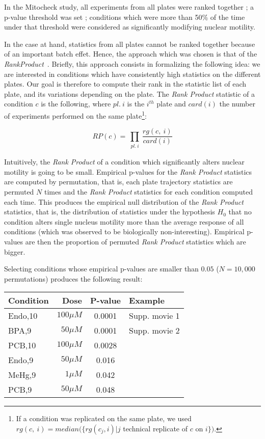 In the Mitocheck study, all experiments from all plates were ranked together ; a p-value threshold was set ; conditions which were more than 50\% of the time under that threshold were considered as significantly modifying nuclear motility. 

In the case at hand, statistics from all plates cannot be ranked together because of an important batch effet. Hence, the approach which was chosen is that of the \textit{RankProduct}~\cite{pmid15327980}. Briefly, this approach consists in formalizing the following idea: we are interested in conditions which have consistently high statistics on the different plates. Our goal is therefore to compute their rank in the statistic list of each plate, and its variations depending on the plate. The \textit{Rank Product} statistic of a condition $c$ is the following, where $pl.~i$ is the $i^{th}$ plate and $card(i)$ the number of experiments performed on the same plate\footnote{If a condition was replicated on the same plate, we used\\
 $rg(c,~i)=median(\{ rg(c_j,i)|j$ technical replicate of $c$ on $i\} )$.}: 

\[RP(c) = \prod_{\substack{pl.~i}} \dfrac{rg(c,~i)}{card(i)} \]

Intuitively, the \textit{Rank Product} of a condition which significantly alters nuclear motility is going to be small. Empirical p-values for the \textit{Rank Product} statistics are computed by permutation, that is, each plate trajectory statistics are permuted $N$ times and the \textit{Rank Product} statistics for each condition computed each time. This produces the empirical null distribution of the \textit{Rank Product} statistics, that is, the distribution of statistics under the hypothesis $H_0$ that no condition alters single nucleus motility more than the average response of all conditions (which was observed to be biologically non-interesting). Empirical p-values are then the proportion of permuted \textit{Rank Product} statistics which are bigger.

Selecting conditions whose empirical p-values are smaller than $0.05$ ($N=10,000$ permutations) produces the following result:
\begin{table}[!ht]
\centering
\begin{tabular}{|l|r|c|l|}
\hline
Condition & Dose & P-value & Example\\
\hline
Endo,10 &$100\mu M$ &0.0001&Supp. movie 1\\
BPA,9 &$50\mu M$ &0.0001 & Supp. movie 2\\
PCB,10 & $100\mu M$ &0.0028&\\
Endo,9 & $50\mu M$ &0.016&\\
MeHg,9 & $1\mu M$&	0.042&\\
PCB,9 & $50\mu M$ &0.048&\\
\hline
\end{tabular}
\end{table} 				%


